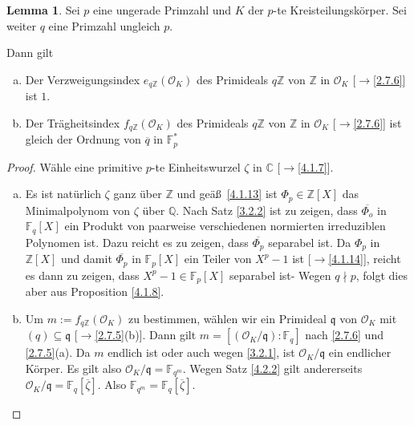 \documentclass[
twoside=semi,
fontsize=12,
DIV=12, 
cleardoublepage=current,
leqno,
headings=optiontoheadandtoc, 
toc=idx
]{scrbook}
\newcommand{\Z}{\mathbb{Z}}
\newcommand{\Q}{\mathbb{Q}}
\newcommand{\C}{\mathbb{C}}
\newcommand{\F}{\mathbb{F}}
\theoremstyle{definition}
\newtheorem{lemma}[definition]{Lemma}
\begin{document}
 	\begin{lemma}\label{4.3.4}\hfill\newline
		Sei $p$ eine ungerade Primzahl und $K$ der $p$-te Kreisteilungsk\"orper. Sei weiter $q$ eine Primzahl ungleich $p$.
		
		\medskip\noindent
		Dann gilt
		\begin{enumerate}[(a)]
			\item Der Verzweigungsindex $e_{q\Z}(\mathcal{O}_K)$ des Primideals $q\Z$ von $\Z$ in $\mathcal{O}_K$ [$\to$\ref{2.7.6}] ist $1$.
			\item Der Tr\"agheitsindex $f_{q\Z}(\mathcal{O}_K)$ des Primideals $q\Z$ von $\Z$ in $\mathcal{O}_K$ [$\to$\ref{2.7.6}] ist gleich der 
			Ordnung von $\overline{q}$ in $\F_p^*$
		\end{enumerate}
	
		\begin{proof}
			W\"ahle eine primitive $p$-te Einheitswurzel $\zeta$ in $\C$ [$\to$\ref{4.1.7}].
			\begin{enumerate}[(a)]
				\item Es ist nat\"urlich $\zeta$ ganz \"uber $\Z$ und ge\"a\ss\ \ref{4.1.13} ist $\Phi_p \in \Z[X]$ das Minimalpolynom von $\zeta$ \"uber $\Q$.
				Nach Satz \ref{3.2.2} ist zu zeigen, dass $\overline{\Phi_o}$ in $\F_q[X]$ ein Produkt von paarweise verschiedenen normierten irreduziblen Polynomen ist. 
				Dazu reicht es zu zeigen, dass $\overline{\Phi_p}$ separabel ist. Da $\Phi_p$ in $\Z[X]$ und damit $\overline{\Phi_p}$ in $\F_p[X]$ ein Teiler von $X^p-1$ ist [$\to$\ref{4.1.14}],
				reicht es dann zu zeigen, dass $X^p-1 \in \F_p[X]$ separabel ist- Wegen $q\nmid p$, folgt dies aber aus Proposition \ref{4.1.8}.
				
				\item Um $m:= f_{q\Z}(\mathcal{O}_K)$ zu bestimmen, w\"ahlen wir ein Primideal $\mathfrak{q}$ von $\mathcal{O}_K$ mit $(q) \subseteq \mathfrak{q}$ [$\to$\ref{2.7.5}(b)].
				Dann gilt $m = [(\mathcal{O}_K/\mathfrak{q}):\F_q]$ nach \ref{2.7.6} und \ref{2.7.5}(a). Da $m$ endlich ist oder auch wegen \ref{3.2.1}, ist $\mathcal{O}_K/\mathfrak{q}$ ein endlicher K\"orper. Es gilt also $\mathcal{O}_K/\mathfrak{q} = \F_{q^m}$. Wegen Satz \ref{4.2.2} gilt andererseits $\mathcal{O}_K/\mathfrak{q} = \F_q[\overline{\zeta}]$. Also $\F_{q^m} = \F_q[\overline{\zeta}]$.
				

\end{enumerate}
\end{proof}
\end{lemma}
\end{document}
